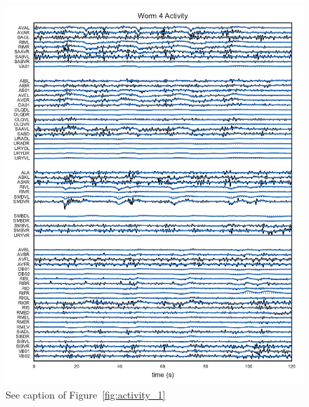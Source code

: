 \documentclass{article}
\begin{document}
\begin{figure}[h]
  \centering
  \includegraphics[width=5.5in]{figures/lds/y_3}
  \caption{See caption of Figure~\ref{fig:activity_1}}
  \label{fig:activity_4}
\end{figure}
\end{document}
